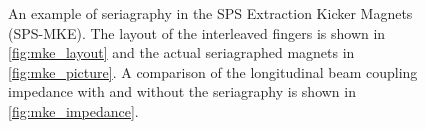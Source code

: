 \begin{figure}
\begin{center}
\end{center}
\caption{An example of seriagraphy in the SPS Extraction Kicker Magnets (SPS-MKE). The layout of the interleaved fingers is shown in \ref{fig:mke_layout} and the actual seriagraphed magnets in \ref{fig:mke_picture}. A comparison of the longitudinal beam coupling impedance with and without the seriagraphy is shown in \ref{fig:mke_impedance}.}
\label{fig:mke_figures}
\end{figure}

